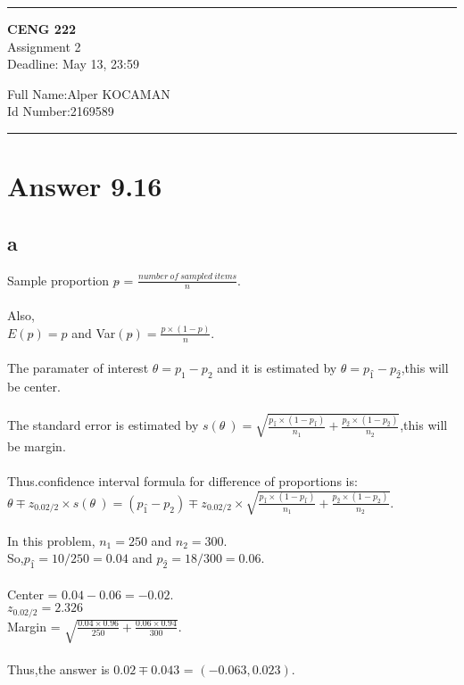 \documentclass[11pt]{article}
\newcommand{\HRule}{\rule{\linewidth}{1mm}}
\begin{document}
\noindent
\HRule
\begin{center}
\Large 
\textbf{CENG 222}  \\
\normalsize 
Assignment 2 \\
Deadline: May 13, 23:59 \\
\end{center}
\begin{flushleft}
\normalsize 
	Full Name:Alper KOCAMAN	\\
	Id Number:2169589
\end{flushleft}
\HRule

\section*{Answer 9.16}
\subsection*{a}

Sample proportion $p\widehat{}$ = $\frac{number\ of\ sampled\ items}{n}$.\\\\
Also,\\$E(p\widehat{})= p$  and Var$(p\widehat{})=\frac{p\times (1-p)}{n}$.\\\\
The paramater of interest $\theta=p_1 - p_2$ and it is estimated by $\theta\widehat{}=p_1\widehat{} - p_2\widehat{}$,this will be center.\\\\
The standard error is estimated by $s(\theta\widehat{}\ )=\sqrt{\frac{p_1\widehat{}\times (1-p_1\widehat{})}{n_1} + \frac{p_2\widehat{}\times (1-p_2\widehat{})}{n_2}}$,this will be margin.\\\\
Thus.confidence interval formula for difference of proportions is:\\

$\theta\widehat{}\mp z_{0.02/2}\times s(\theta\widehat{}\ )=(p_1\widehat{} - p_2\widehat{}) \mp z_{0.02/2} \times \sqrt{\frac{p_1\widehat{}\times (1-p_1\widehat{})}{n_1} + \frac{p_2\widehat{}\times (1-p_2\widehat{})}{n_2}}$.\\\\
In this problem, $n_1 = 250$ and $n_2 = 300$.\\So,$p_1\widehat{}=10/250 =0.04$ and $p_2\widehat{}=18/300=0.06$.\\\\
Center = $0.04-0.06=-0.02$.\\
$z_{0.02/2} = 2.326$\\
Margin = $\sqrt{\frac{0.04\times 0.96}{250} + \frac{0.06\times 0.94}{300}}$.\\\\
Thus,the answer is $0.02 \mp 0.043$ = $(-0.063,0.023)$.	 
\end{document}
